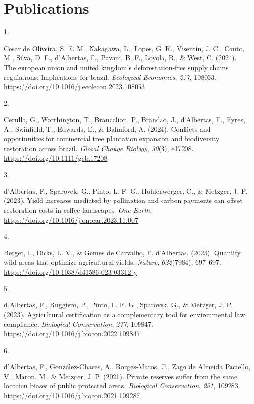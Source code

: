 \documentclass[11pt,a4paper,]{awesome-cv}
\newlength{\cslhangindent}
\newlength{\csllabelwidth}
\newenvironment{CSLReferences}[2] %
 {\begin{list}{}{%
  \setlength{\itemindent}{0pt}
  \setlength{\leftmargin}{0pt}
  \setlength{\parsep}{0pt}
  \ifodd #1
   \setlength{\leftmargin}{\cslhangindent}
   \setlength{\itemindent}{-1\cslhangindent}
  \fi
  \setlength{\itemsep}{#2\baselineskip}}}
 {\end{list}}
\newcommand{\CSLLeftMargin}[1]{\parbox[t]{\csllabelwidth}{\strut#1\strut}}
\newcommand{\CSLRightInline}[1]{\parbox[t]{\linewidth - \csllabelwidth}{\strut#1\strut}}
\begin{document}
\section{Publications}\label{publications}

\label{refs-ff2c724deb9e38dfc8883b24c904ba59}
\begin{CSLReferences}{0}{0}
\CSLLeftMargin{1. }%
\CSLRightInline{Cesar de Oliveira, S. E. M., Nakagawa, L., Lopes, G. R.,
Visentin, J. C., Couto, M., Silva, D. E., d'Albertas, F., Pavani, B. F.,
Loyola, R., \& West, C. (2024). The european union and united kingdom's
deforestation-free supply chains regulations: Implications for brazil.
\emph{Ecological Economics}, \emph{217}, 108053.
\url{https://doi.org/10.1016/j.ecolecon.2023.108053}}

\CSLLeftMargin{2. }%
\CSLRightInline{Cerullo, G., Worthington, T., Brancalion, P., Brandão,
J., d'Albertas, F., Eyres, A., Swinfield, T., Edwards, D., \& Balmford,
A. (2024). Conflicts and opportunities for commercial tree plantation
expansion and biodiversity restoration across brazil. \emph{Global
Change Biology}, \emph{30}(3), e17208.
\url{https://doi.org/10.1111/gcb.17208}}

\CSLLeftMargin{3. }%
\CSLRightInline{d'Albertas, F., Sparovek, G., Pinto, L.-F. G.,
Hohlenwerger, C., \& Metzger, J.-P. (2023). Yield increases mediated by
pollination and carbon payments can offset restoration costs in coffee
landscapes. \emph{One Earth}.
\url{https://doi.org/10.1016/j.oneear.2023.11.007}}

\CSLLeftMargin{4. }%
\CSLRightInline{Berger, I., Dicks, L. V., \& Gomes de Carvalho, F.
d'Albertas. (2023). Quantify wild areas that optimize agricultural
yields. \emph{Nature}, \emph{622}(7984), 697--697.
\url{https://doi.org/10.1038/d41586-023-03312-y}}

\CSLLeftMargin{5. }%
\CSLRightInline{d'Albertas, F., Ruggiero, P., Pinto, L. F. G., Sparovek,
G., \& Metzger, J. P. (2023). Agricultural certification as a
complementary tool for environmental law compliance. \emph{Biological
Conservation}, \emph{277}, 109847.
\url{https://doi.org/10.1016/j.biocon.2022.109847}}

\CSLLeftMargin{6. }%
\CSLRightInline{d'Albertas, F., González-Chaves, A., Borges-Matos, C.,
Zago de Almeida Paciello, V., Maron, M., \& Metzger, J. P. (2021).
Private reserves suffer from the same location biases of public
protected areas. \emph{Biological Conservation}, \emph{261}, 109283.
\url{https://doi.org/10.1016/j.biocon.2021.109283}}


\end{CSLReferences}
\end{document}
